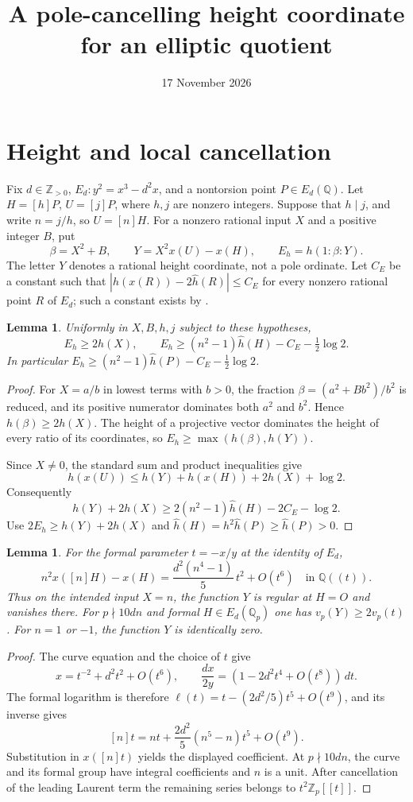 \documentclass[11pt,a4paper]{article}
\title{A pole-cancelling height coordinate for an elliptic quotient}
\author{}\date{17 November 2026}
\newtheorem{lemma}[theorem]{Lemma}
\newcommand{\Q}{\mathbb Q}\newcommand{\Z}{\mathbb Z}
\begin{document}
\maketitle

\section{Height and local cancellation}

Fix $d\in\Z_{>0}$, $E_d:y^2=x^3-d^2x$, and a nontorsion point
$P\in E_d(\Q)$. Let $H=[h]P$, $U=[j]P$, where $h,j$ are
nonzero integers. Suppose that $h\mid j$, and write $n=j/h$, so
$U=[n]H$. For a nonzero rational input $X$ and a positive integer
$B$, put
\[
 \beta=X^2+B,\qquad
 Y=X^2x(U)-x(H),\qquad
 E_h=h(1:\beta:Y).
\]
The letter $Y$ denotes a rational height coordinate, not a pole
ordinate. Let $C_E$ be a constant such that
$|h(x(R))-2\widehat h(R)|\le C_E$ for every nonzero rational
point $R$ of $E_d$; such a constant exists by
\cite[Chapter VIII, Section9]{AEC}.

\begin{lemma}\label{lem:height}
Uniformly in $X,B,h,j$ subject to these hypotheses,
\[
 E_h\ge2h(X),\qquad
 E_h\ge(n^2-1)\widehat h(H)-C_E-\tfrac12\log2.
\]
In particular
$E_h\ge(n^2-1)\widehat h(P)-C_E-\tfrac12\log2$.
\end{lemma}
\begin{proof}
For $X=a/b$ in lowest terms with $b>0$, the fraction
$\beta=(a^2+Bb^2)/b^2$ is reduced, and its positive numerator
dominates both $a^2$ and $b^2$. Hence $h(\beta)\ge2h(X)$.
The height of a projective vector dominates the height of every
ratio of its coordinates, so $E_h\ge\max(h(\beta),h(Y))$.

Since $X\ne0$, the standard sum and product inequalities give
\[
 h(x(U))\le h(Y)+h(x(H))+2h(X)+\log2.
\]
Consequently
\[
 h(Y)+2h(X)\ge2(n^2-1)\widehat h(H)-2C_E-\log2.
\]
Use $2E_h\ge h(Y)+2h(X)$ and
$\widehat h(H)=h^2\widehat h(P)\ge\widehat h(P)>0$.
\end{proof}

\begin{lemma}\label{lem:local}
For the formal parameter $t=-x/y$ at the identity of $E_d$,
\[
 n^2x([n]H)-x(H)
       =\frac{d^2(n^4-1)}5\,t^2+O(t^6)\quad\text{in }\Q((t)).
\]
Thus on the intended input $X=n$, the function $Y$ is regular
at $H=O$ and vanishes there. For $p\nmid 10dn$ and formal
$H\in E_d(\Q_p)$ one has $v_p(Y)\ge2v_p(t)$.
For $n=1$ or $-1$, the function $Y$ is identically zero.
\end{lemma}
\begin{proof}
The curve equation and the choice of $t$ give
\[
 x=t^{-2}+d^2t^2+O(t^6),\qquad
 \frac{dx}{2y}=(1-2d^2t^4+O(t^8))\,dt.
\]
The formal logarithm is therefore
$\ell(t)=t-(2d^2/5)t^5+O(t^9)$, and its inverse gives
\[
 [n]t=nt+\frac{2d^2}{5}(n^5-n)t^5+O(t^9).
\]
Substitution in $x([n]t)$ yields the displayed coefficient.
At $p\nmid10dn$, the curve and its formal group have integral
coefficients and $n$ is a unit. After cancellation of the leading
Laurent term the remaining series belongs to $t^2\Z_p[[t]]$.
\end{proof}
\end{document}
